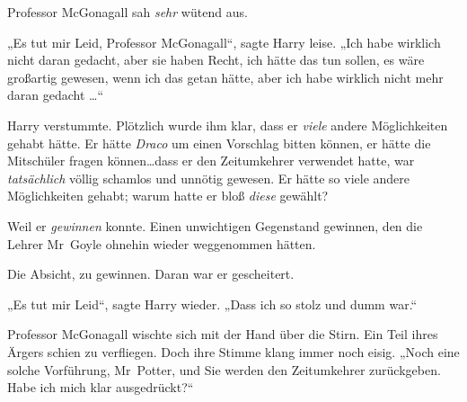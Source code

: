 Professor McGonagall sah \emph{sehr} wütend aus.

„Es tut mir Leid, Professor McGonagall“, sagte Harry leise. „Ich habe wirklich nicht daran gedacht, aber sie haben Recht, ich hätte das tun sollen, es wäre großartig gewesen, wenn ich das getan hätte, aber ich habe wirklich nicht mehr daran gedacht …“

Harry verstummte. Plötzlich wurde ihm klar, dass er \emph{viele} andere Möglichkeiten gehabt hätte. Er hätte \emph{Draco} um einen Vorschlag bitten können, er hätte die Mitschüler fragen können…dass er den Zeitumkehrer verwendet hatte, war \emph{tatsächlich} völlig schamlos und unnötig gewesen. Er hätte so viele andere Möglichkeiten gehabt; warum hatte er bloß \emph{diese} gewählt?

Weil er \emph{gewinnen} konnte. Einen unwichtigen Gegenstand gewinnen, den die Lehrer Mr~Goyle ohnehin wieder weggenommen hätten.

Die Absicht, zu gewinnen. Daran war er gescheitert.

„Es tut mir Leid“, sagte Harry wieder. „Dass ich so stolz und dumm war.“

Professor McGonagall wischte sich mit der Hand über die Stirn. Ein Teil ihres Ärgers schien zu verfliegen. Doch ihre Stimme klang immer noch eisig. „Noch eine solche Vorführung, Mr~Potter, und Sie werden den Zeitumkehrer zurückgeben. Habe ich mich klar ausgedrückt?“

